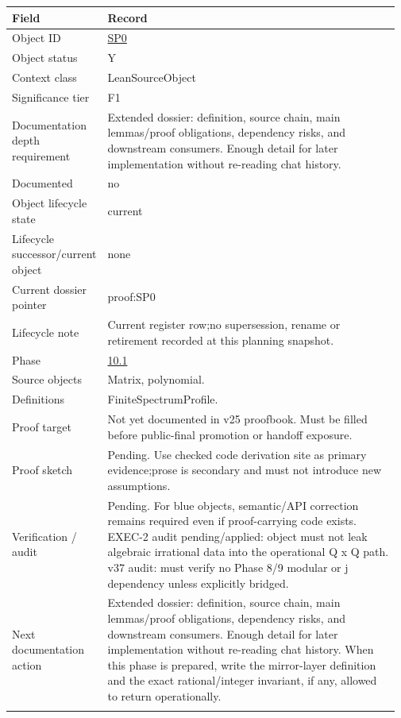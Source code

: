 \begin{longtable}{L{0.16\linewidth} L{0.81\linewidth}}
\hline
\textbf{Field} & \textbf{Record}\\
\hline
Object ID & \hyperlink{object-row-SP0}{SP0}\\
\hline\addlinespace[0.20em]
Object status & Y\\
\hline\addlinespace[0.20em]
Context class & LeanSourceObject\\
\hline\addlinespace[0.20em]
Significance tier & F1\\
\hline\addlinespace[0.20em]
Documentation depth requirement & Extended dossier: definition, source chain, main lemmas/\allowbreak{}proof obligations, dependency risks, and downstream consumers. Enough detail for later implementation without re-reading chat history.\\
\hline\addlinespace[0.20em]
Documented & no\\
\hline\addlinespace[0.20em]
Object lifecycle state & current\\
\hline\addlinespace[0.20em]
Lifecycle successor/\allowbreak{}current object & none\\
\hline\addlinespace[0.20em]
Current dossier pointer & proof:SP0\\
\hline\addlinespace[0.20em]
Lifecycle note & Current register row;\newline no supersession, rename or retirement recorded at this planning snapshot.\\
\hline\addlinespace[0.20em]
Phase & \hyperlink{phase-row-10-1}{10.1}\\
\hline\addlinespace[0.20em]
Source objects & Matrix, polynomial.\\
\hline\addlinespace[0.20em]
Definitions & FiniteSpectrumProfile.\\
\hline\addlinespace[0.20em]
Proof target & Not yet documented in v25 proofbook. Must be filled before public-final promotion or handoff exposure.\\
\hline\addlinespace[0.20em]
Proof sketch & Pending. Use checked code derivation site as primary evidence;\newline prose is secondary and must not introduce new assumptions.\\
\hline\addlinespace[0.20em]
Verification /\allowbreak{} audit & Pending. For blue objects, semantic/\allowbreak{}API correction remains required even if proof-carrying code exists. EXEC-2 audit pending/\allowbreak{}applied: object must not leak algebraic irrational data into the operational Q x Q path. v37 audit: must verify no Phase 8/\allowbreak{}9 modular or j dependency unless explicitly bridged.\\
\hline\addlinespace[0.20em]
Next documentation action & Extended dossier: definition, source chain, main lemmas/\allowbreak{}proof obligations, dependency risks, and downstream consumers. Enough detail for later implementation without re-reading chat history. When this phase is prepared, write the mirror-layer definition and the exact rational/\allowbreak{}integer invariant, if any, allowed to return operationally.\\
\hline\addlinespace[0.20em]
\end{longtable}
